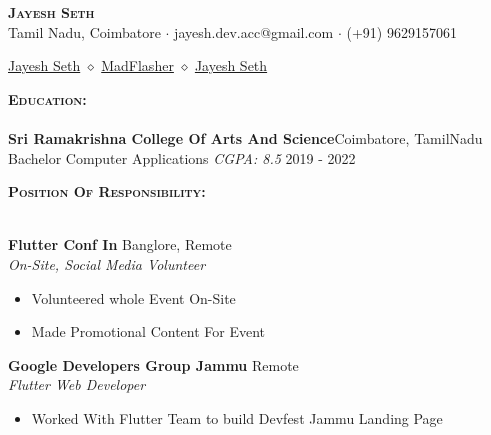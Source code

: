\documentclass[a4paper]{article}
\newcommand{\lineunder} {
    \vspace*{-8pt} \\
    \hspace*{-18pt} \hrulefill \\
}
\newcommand{\header} [1] {
    {\hspace*{-18pt}\vspace*{6pt} \textsc{#1} }
    \vspace*{-6pt} \lineunder
}
\begin{document}
\vspace*{-40pt}

    

\vspace*{-10pt}
\begin{center}
	{\Huge \bfseries \scshape {Jayesh Seth}}\\
	 Tamil Nadu, Coimbatore $\cdot$ 
         jayesh.dev.acc@gmail.com $\cdot$ 
         (+91) 9629157061\\
\end{center}

\begin{center}
    \href{https://www.linkedin.com/in/jayesh-seth-0b80a8217/}{Jayesh Seth} $\diamond$ 
     \href{https://github.com/MadFlasheroo7}{MadFlasher} $\diamond$
     \href{https://twitter.com/Madflasheroo7}{Jayesh Seth}\\
\end{center}

\header{ \textbf{Education:}}
\textbf{Sri Ramakrishna College Of Arts And Science}\hfill Coimbatore, TamilNadu\\
Bachelor Computer Applications \textit{CGPA: 8.5} \hfill 2019 - 2022\\
\vspace*{4pt}

\header{ \textbf{Position Of Responsibility:}}
\vspace{1mm}

\textbf{Flutter Conf In} \hfill Banglore, Remote\\
\textit{On-Site, Social Media Volunteer}\\
\vspace{-1mm}
\begin{itemize} \itemsep 1pt
	\item Volunteered whole Event On-Site
	\item Made Promotional Content For Event
\end{itemize}

\textbf{Google Developers Group Jammu} \hfill Remote\\
\textit{Flutter Web Developer}\\
\vspace{-1mm}
\begin{itemize} \itemsep 1pt
	\item Worked With Flutter Team to build Devfest Jammu Landing Page
\end{itemize}
\end{document}
